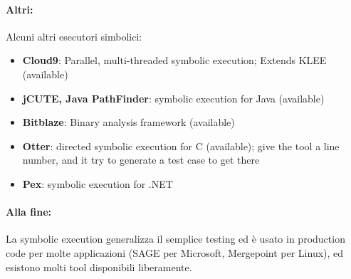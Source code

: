 \paragraph{Altri:} Alcuni altri esecutori simbolici: 
\begin{itemize}
	\item \textbf{Cloud9}: Parallel, multi-threaded symbolic execution; Extends KLEE (available)

	\item \textbf{jCUTE, Java PathFinder}: symbolic execution for Java (available)

	\item \textbf{Bitblaze}: Binary analysis framework (available)

	\item \textbf{Otter}: directed symbolic execution for C (available); give the tool a line number, and it try to generate a test case to get there

	\item \textbf{Pex}: symbolic execution for .NET
\end{itemize}

\paragraph{Alla fine:} La symbolic execution generalizza il semplice testing ed è usato in production code per molte applicazioni (SAGE per Microsoft, Mergepoint per Linux), ed esistono molti tool disponibili liberamente.
